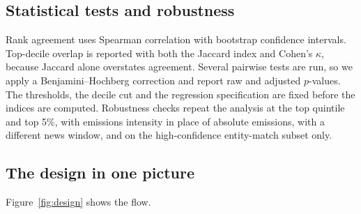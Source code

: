 \documentclass[12pt,a4paper]{article}
\begin{document}
\subsection{Statistical tests and robustness}

Rank agreement uses Spearman correlation with bootstrap confidence intervals. Top-decile overlap is
reported with both the Jaccard index and Cohen's $\kappa$, because Jaccard alone overstates
agreement. Several pairwise tests are run, so we apply a Benjamini--Hochberg correction and report
raw and adjusted $p$-values. The thresholds, the decile cut and the regression specification are
fixed before the indices are computed. Robustness checks repeat the analysis at the top quintile and
top 5\%, with emissions intensity in place of absolute emissions, with a different news window, and
on the high-confidence entity-match subset only.

\subsection{The design in one picture}

Figure~\ref{fig:design} shows the flow.
\end{document}
